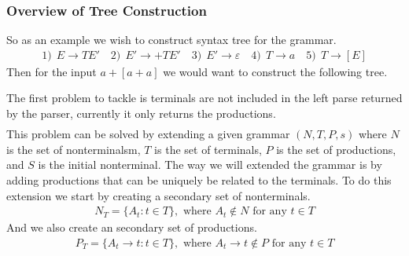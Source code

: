 \documentclass[a4paper,12pt]{article}
\theoremstyle{definition}
\begin{document}
\subsubsection{Overview of Tree Construction}
So as an example we wish to construct syntax tree for the grammar.
\begin{gather*}
  1)\:\: E \to TE' \quad 2)\:\: E' \to +TE' \quad 3)\:\: E' \to \varepsilon \quad 4)\:\: T \to a \quad 5) \: \: T \to [E]
\end{gather*}
Then for the input $a+[a + a]$ we would want to construct the following tree.
\begin{center}
\end{center}
The first problem to tackle is terminals are not included in the left parse returned by the parser, currently it only returns the productions.
\begin{gather*}
  [E_1, T_4, E_2', T_5, E_1, T_4, E_2', T_4, E_3', E_3']
\end{gather*}
This problem can be solved by extending a given grammar $(N, T, P, s)$ where $N$ is the set of nonterminalsm, $T$ is the set of terminals, $P$ is the set of productions, and $S$ is the initial nonterminal. The way we will extended the grammar is by adding productions that can be uniquely be related to the terminals. To do this extension we start by creating a secondary set of nonterminals.
\begin{align*}
  N_{T} = \{A_t : t \in T\}, \text{ where } A_t \notin N \text{ for any } t \in T
\end{align*}
And we also create an secondary set of productions.
\begin{align*}
  P_{T} = \{A_t \to t : t \in T\}, \text{ where } A_t \to t \notin P \text{ for any } t \in T
\end{align*}
\end{document}
